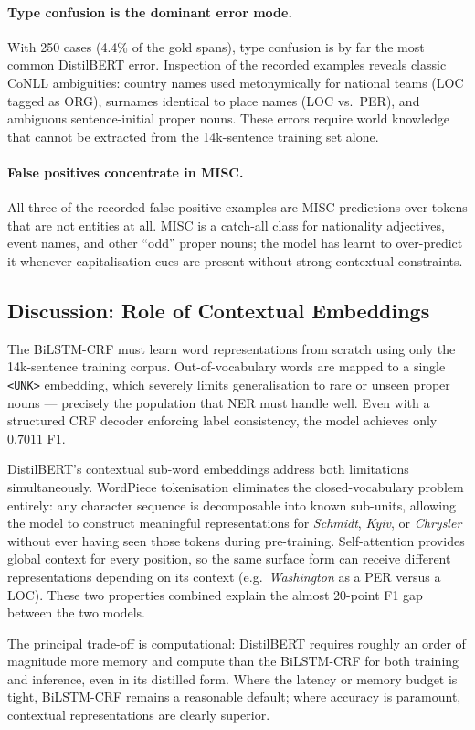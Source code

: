 \paragraph{Type confusion is the dominant error mode.}
With 250 cases (4.4\% of the gold spans), type confusion is by far the
most common DistilBERT error. Inspection of the recorded examples
reveals classic CoNLL ambiguities: country names used metonymically for
national teams (\textsc{LOC} tagged as \textsc{ORG}), surnames identical
to place names (\textsc{LOC} vs.\ \textsc{PER}), and ambiguous
sentence-initial proper nouns. These errors require world knowledge
that cannot be extracted from the 14k-sentence training set alone.

\paragraph{False positives concentrate in \textsc{MISC}.}
All three of the recorded false-positive examples are \textsc{MISC}
predictions over tokens that are not entities at all. \textsc{MISC} is a
catch-all class for nationality adjectives, event names, and other
``odd'' proper nouns; the model has learnt to over-predict it whenever
capitalisation cues are present without strong contextual constraints.

\subsection{Discussion: Role of Contextual Embeddings}

The BiLSTM-CRF must learn word representations from scratch using only
the 14k-sentence training corpus. Out-of-vocabulary words are mapped to
a single \texttt{<UNK>} embedding, which severely limits generalisation
to rare or unseen proper nouns --- precisely the population that NER
must handle well. Even with a structured CRF decoder enforcing label
consistency, the model achieves only $0.7011$ F1.

DistilBERT's contextual sub-word embeddings address both limitations
simultaneously. WordPiece tokenisation eliminates the closed-vocabulary
problem entirely: any character sequence is decomposable into known
sub-units, allowing the model to construct meaningful representations
for \textit{Schmidt}, \textit{Kyiv}, or \textit{Chrysler} without ever
having seen those tokens during pre-training. Self-attention provides
global context for every position, so the same surface form can receive
different representations depending on its context (e.g.\
\textit{Washington} as a \textsc{PER} versus a \textsc{LOC}). These two
properties combined explain the almost 20-point F1 gap between the two
models.

The principal trade-off is computational: DistilBERT requires roughly an
order of magnitude more memory and compute than the BiLSTM-CRF for both
training and inference, even in its distilled form. Where the latency
or memory budget is tight, BiLSTM-CRF remains a reasonable default;
where accuracy is paramount, contextual representations are clearly
superior.
